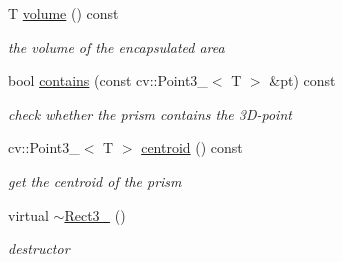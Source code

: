 \begin{DoxyCompactItemize}
T \hyperlink{class_rect3___a766842fae2533d47ccf9b7fb428670c8}{volume} () const 
\begin{DoxyCompactList}\small\item\em the volume of the encapsulated area \end{DoxyCompactList}\item 
bool \hyperlink{class_rect3___ad9928349a9a8bca8f98a1bf1cab676e9}{contains} (const cv\-::\-Point3\-\_\-$<$ T $>$ \&pt) const 
\begin{DoxyCompactList}\small\item\em check whether the prism contains the 3\-D-\/point \end{DoxyCompactList}\item 
cv\-::\-Point3\-\_\-$<$ T $>$ \hyperlink{class_rect3___addafb9e6380c9a3ffd4f394d311c59b6}{centroid} () const 
\begin{DoxyCompactList}\small\item\em get the centroid of the prism \end{DoxyCompactList}\item 
virtual \hyperlink{class_rect3___a297683142c5197991bfaabdb2305a37c}{$\sim$\-Rect3\-\_\-} ()
\begin{DoxyCompactList}\small\item\em destructor \end{DoxyCompactList}\end{DoxyCompactItemize}
